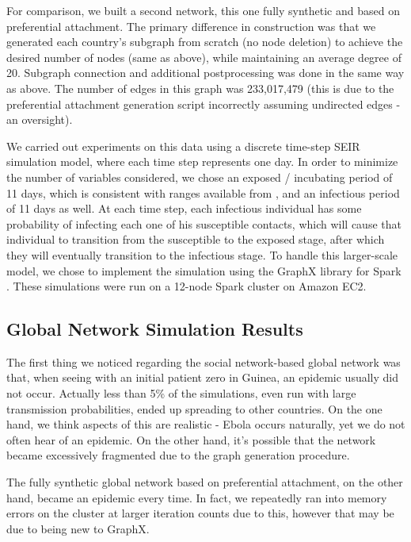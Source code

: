 \documentclass[10pt, journal,onecolumn]{IEEEtran}
\begin{document}
For comparison, we built a second network, this one fully synthetic and based on preferential attachment.
The primary difference in construction was that we generated each country's subgraph from scratch
(no node deletion) to achieve the desired number of nodes (same as above), while maintaining an average
degree of 20. Subgraph connection and additional postprocessing was done in the same way as above.
The number of edges in this graph was 233,017,479 (this is due to the preferential attachment generation
script incorrectly assuming undirected edges - an oversight).

We carried out experiments on this data using a discrete time-step SEIR simulation model,
where each time step represents one day. In order to minimize the number of variables considered,
we chose an exposed / incubating period of 11 days, which is consistent with ranges available
from \citep{whoebolafacts}, and an infectious period of 11 days as well. At each time step, each
infectious individual has some probability of infecting each one of his susceptible contacts, which
will cause that individual to transition from the susceptible to the exposed stage, after which
they will eventually transition to the infectious stage. To handle this larger-scale model, we chose
to implement the simulation using the GraphX library \citep{xin2013graphx} for Spark
\citep{zaharia2010spark}. These simulations were run on a 12-node Spark cluster on Amazon EC2.

\subsection{{Global Network Simulation Results}}

The first thing we noticed regarding the social network-based global network was that, when seeing
with an initial patient zero in Guinea, an epidemic usually did not occur. Actually less than 5\%
of the simulations, even run with large transmission probabilities, ended up spreading to other
countries. On the one hand, we think aspects of this are realistic - Ebola occurs naturally, yet we
do not often hear of an epidemic. On the other hand, it's possible that the network became excessively
fragmented due to the graph generation procedure.

The fully synthetic global network based on preferential attachment, on the other hand, became an
epidemic every time. In fact, we repeatedly ran into memory errors on the cluster at larger iteration
counts due to this, however that may be due to being new to GraphX.
\end{document}
